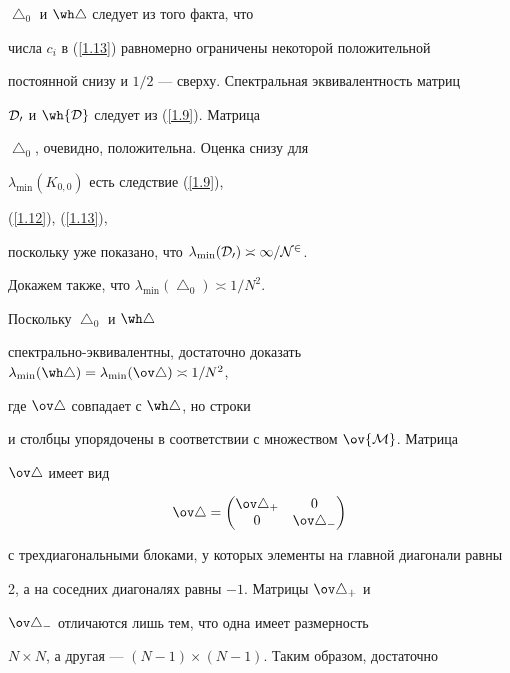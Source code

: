 \begin{pf}
$\bigtriangleup_{0}$ и $\wh\bigtriangleup$ следует из того факта, что


числа $c_i$ в (\ref{1.13}) равномерно ограничены некоторой положительной


постоянной снизу и $1/2$ --- сверху. Спектральная эквивалентность матриц


$\cal D_0$ и $\wh{\cal D}$ следует из (\ref{1.9}). Матрица


$\bigtriangleup_{0}$, очевидно, положительна. Оценка снизу для


$\lambda_{\min}(K_{0,0})$ есть следствие (\ref{1.9}),


(\ref{1.12}), (\ref{1.13}),


поскольку уже показано, что $\lambda_{\min}(\cal D_0)\asymp1/N^2$.





Докажем также, что $\lambda_{\min}(\bigtriangleup_0)\asymp1/N^2$.


Поскольку $\bigtriangleup_0$ и $\wh\bigtriangleup$


спектрально-эквивалентны, достаточно доказать $\lambda_{\min}(\wh


\bigtriangleup)=\lambda_{\min}(\ov\bigtriangleup)\asymp 1/N^2$,


где $\ov\bigtriangleup$ совпадает с $\wh\bigtriangleup$, но строки


и столбцы упорядочены в соответствии с множеством $\ov{\cal M}$. Матрица


$\ov\bigtriangleup$ имеет вид


\begin{equation}\label{1.14}


\ov\bigtriangleup=\begin{pmatrix}


\ov\bigtriangleup_+ & 0 \\ 0 & \ov\bigtriangleup_-


\end{pmatrix}


\end{equation}


с трехдиагональными блоками, у которых элементы на главной диагонали равны


2, а на соседних диагоналях равны ${-}1$. Матрицы $\ov\bigtriangleup_+$ и


$\ov\bigtriangleup_-$ отличаются лишь тем, что одна имеет размерность


$N\times N$, а другая --- $(N-1)\times (N-1)$. Таким образом, достаточно



\end{pf}
